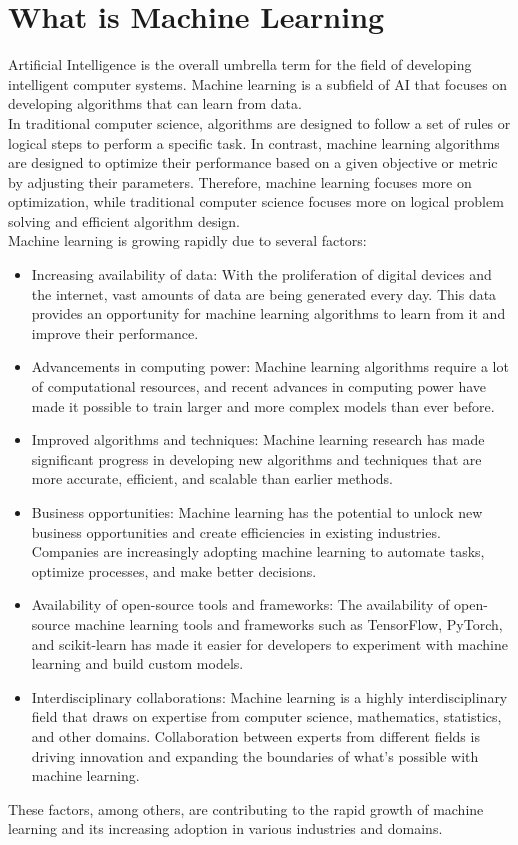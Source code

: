 \documentclass{article}
\begin{document}
\section{What is Machine Learning}
Artificial Intelligence is the overall umbrella term for the field of developing intelligent computer systems. Machine learning is a subfield of AI that focuses on developing algorithms that can learn from data.\\
In traditional computer science, algorithms are designed to follow a set of rules or logical steps to perform a specific task.
In contrast, machine learning algorithms are designed to optimize their performance based on a given objective or metric by adjusting their parameters.
Therefore, machine learning focuses more on optimization, while traditional computer science focuses more on logical problem solving and efficient algorithm design.\\
\noindent Machine learning is growing rapidly due to several factors:
\begin{itemize}
    \item Increasing availability of data: With the proliferation of digital devices and the internet, vast amounts of data are being generated every day. This data provides an opportunity for machine learning algorithms to learn from it and improve their performance.
    \item Advancements in computing power: Machine learning algorithms require a lot of computational resources, and recent advances in computing power have made it possible to train larger and more complex models than ever before.
    \item Improved algorithms and techniques: Machine learning research has made significant progress in developing new algorithms and techniques that are more accurate, efficient, and scalable than earlier methods.
    \item Business opportunities: Machine learning has the potential to unlock new business opportunities and create efficiencies in existing industries. Companies are increasingly adopting machine learning to automate tasks, optimize processes, and make better decisions.
    \item Availability of open-source tools and frameworks: The availability of open-source machine learning tools and frameworks such as TensorFlow, PyTorch, and scikit-learn has made it easier for developers to experiment with machine learning and build custom models.
    \item Interdisciplinary collaborations: Machine learning is a highly interdisciplinary field that draws on expertise from computer science, mathematics, statistics, and other domains. Collaboration between experts from different fields is driving innovation and expanding the boundaries of what's possible with machine learning.
\end{itemize}
These factors, among others, are contributing to the rapid growth of machine learning and its increasing adoption in various industries and domains.
\end{document}
